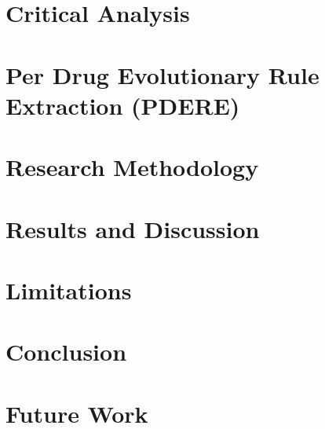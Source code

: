 \documentclass[a4paper,12pt]{article}
\begin{document}
\section{Critical Analysis}\label{sec:critical}


\section[Per Drug Evolutionary Rule Extraction (PDERE)]{Per Drug Evolutionary Rule\texorpdfstring{\\}{ } Extraction (PDERE)}\label{sec:pdere}


\section{Research Methodology}


\section{Results and Discussion}\label{sec:results}

\section{Limitations}


\section{Conclusion}


\section{Future Work}


\clearpage
{}


\clearpage

\end{document}
